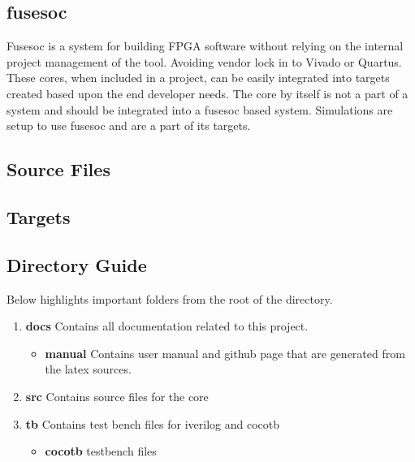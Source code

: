 \subsection{fusesoc}
\par
Fusesoc is a system for building FPGA software without relying on the internal project management of the tool. Avoiding vendor lock in to Vivado or Quartus.
These cores, when included in a project, can be easily integrated into targets created based upon the end developer needs. The core by itself is not a part of
a system and should be integrated into a fusesoc based system. Simulations are setup to use fusesoc and are a part of its targets.

\subsection{Source Files}



\subsection{Targets}



\subsection{Directory Guide}

\par
Below highlights important folders from the root of the directory.

\begin{enumerate}
  \item \textbf{docs} Contains all documentation related to this project.
    \begin{itemize}
      \item \textbf{manual} Contains user manual and github page that are generated from the latex sources.
    \end{itemize}
  \item \textbf{src} Contains source files for the core
  \item \textbf{tb} Contains test bench files for iverilog and cocotb
    \begin{itemize}
      \item \textbf{cocotb} testbench files
    \end{itemize}
\end{enumerate}

